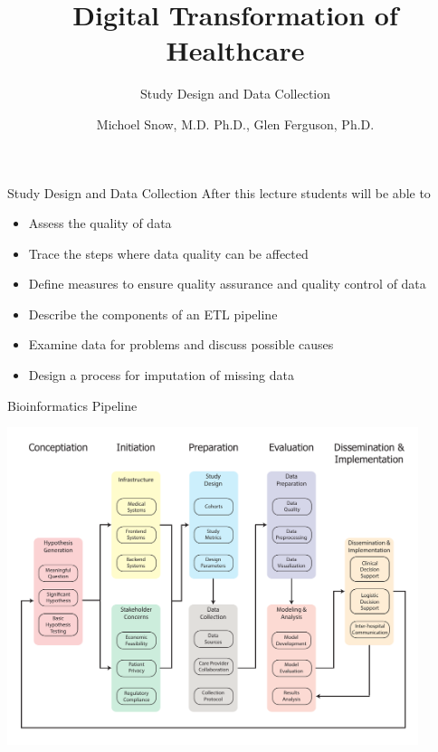 \documentclass[10pt, xcolor=table]{beamer}
\title{Digital Transformation of Healthcare}
\subtitle{Study Design and Data Collection}
\date{}
\author{Michoel Snow, M.D. Ph.D., Glen Ferguson, Ph.D.}
\institute{Center for Health Data Innovations}
\begin{document}
\maketitle

\begin{frame}{Study Design and Data Collection}
	After this lecture students will be able to 
	\begin{itemize}
		\item Assess the quality of data
		\item Trace the steps where data quality can be affected 
		\item Define measures to ensure quality assurance and quality control of data 
		\item Describe the components of an ETL pipeline
		\item Examine data for problems and discuss possible causes
		\item Design a process for imputation of missing data 
	\end{itemize}
\end{frame}


\begin{frame}{Bioinformatics Pipeline}
	\begin{center}
		\includegraphics[width=0.9\textwidth]{images/informatics_pipeline.pdf}	
	\end{center}
\end{frame}
\end{document}

